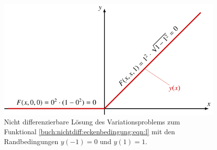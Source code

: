 %
%
%
\begin{figure}
\centering
\includegraphics{chapters/030-nichtdiff/images/nichtdiff.pdf}
\caption{Nicht differenzierbare Lösung des Variationsproblems zum
Funktional \eqref{buch:nichtdiff:eckenbedingung:eqn:l} mit
den Randbedingungen $y(-1)=0$ und $y(1)=1$.
\label{buch:nichtdiff:fig:nichtdiff}}
\end{figure}
